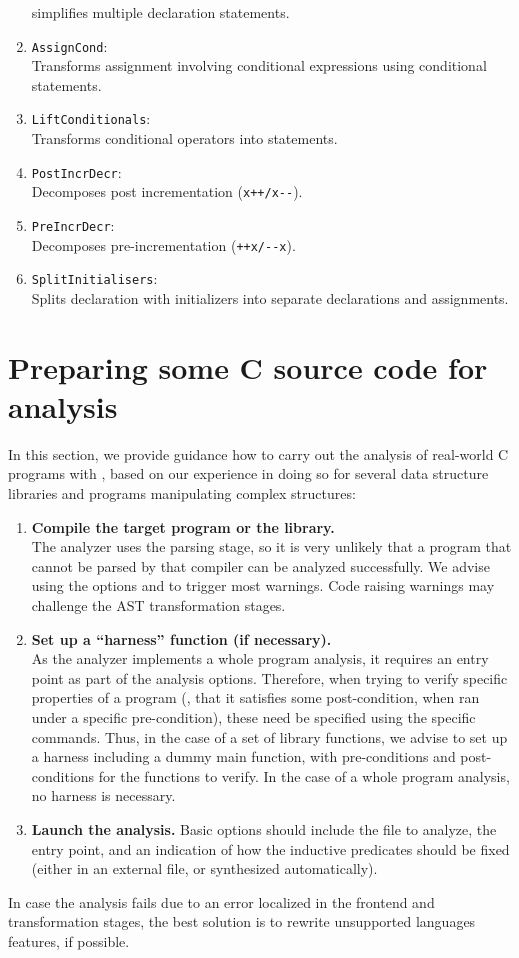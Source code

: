 \begin{enumerate}
  simplifies multiple declaration statements.
\item \texttt{AssignCond}: \\
  Transforms assignment involving conditional expressions using
  conditional statements.
\item \texttt{LiftConditionals}: \\
  Transforms conditional operators into  statements.
\item \texttt{PostIncrDecr}: \\
  Decomposes post incrementation (\verb#x++/x--#).
\item \texttt{PreIncrDecr}: \\
  Decomposes pre-incrementation (\verb#++x/--x#).
\item \texttt{SplitInitialisers}: \\
  Splits declaration with initializers into separate declarations
  and assignments.
\end{enumerate}


\section{Preparing some C source code for analysis}
In this section, we provide guidance how to carry out the analysis of
real-world C programs with \memcad, based on our experience in doing
so for several data structure libraries and programs manipulating
complex structures:
\begin{enumerate}
\item \textbf{Compile the target program or the library.} \\
  The \memcad analyzer uses the  parsing stage, so it
  is very unlikely that a program that cannot be parsed by that
  compiler can be analyzed successfully.
  We advise using the options  and  to
  trigger most warnings.
  Code raising warnings may challenge the AST transformation stages.
\item \textbf{Set up a ``harness''  function (if necessary).} \\
  As the \memcad analyzer implements a whole program analysis, it requires
  an entry point as part of the analysis options.
  Therefore, when trying to verify specific properties of a program
  (\eg, that it satisfies some post-condition, when ran under a specific
  pre-condition), these need be specified using the \memcad specific
  commands.
  Thus, in the case of a set of library functions, we advise to set
  up a harness including a dummy main function, with pre-conditions
  and post-conditions for the functions to verify.
  In the case of a whole program analysis, no harness is necessary.
\item \textbf{Launch the analysis.}
  Basic options should include the file to analyze, the entry point,
  and an indication of how the inductive predicates should be fixed
  (either in an external file, or synthesized automatically).
\end{enumerate}
In case the analysis fails due to an error localized in the frontend
and transformation stages, the best solution is to rewrite unsupported
languages features, if possible.

